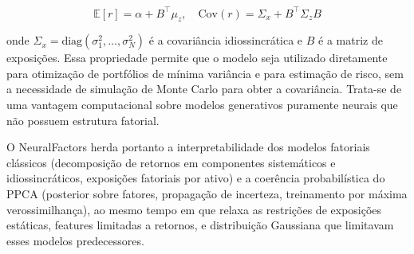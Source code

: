 $$\mathbb{E}[r] = \alpha + B^\top \mu_z, \quad \text{Cov}(r) = \Sigma_x + B^\top \Sigma_z B$$

onde $\Sigma_x = \text{diag}(\sigma_1^2, \ldots, \sigma_N^2)$ é a covariância idiossincrática e $B$ é a matriz de exposições. Essa propriedade permite que o modelo seja utilizado diretamente para otimização de portfólios de mínima variância e para estimação de risco, sem a necessidade de simulação de Monte Carlo para obter a covariância. Trata-se de uma vantagem computacional sobre modelos generativos puramente neurais que não possuem estrutura fatorial.

O NeuralFactors herda portanto a interpretabilidade dos modelos fatoriais clássicos (decomposição de retornos em componentes sistemáticos e idiossincráticos, exposições fatoriais por ativo) e a coerência probabilística do PPCA (posterior sobre fatores, propagação de incerteza, treinamento por máxima verossimilhança), ao mesmo tempo em que relaxa as restrições de exposições estáticas, features limitadas a retornos, e distribuição Gaussiana que limitavam esses modelos predecessores.